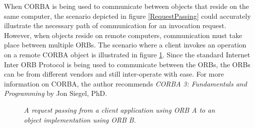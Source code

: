 When CORBA is being used to communicate between objects that reside 
on the same computer, the scenario depicted in figure \ref{RequestPassing}
could accurately illustrate the necessary path of communication for an 
invocation request.  However, when objects reside on remote computers, 
communication must take place between multiple ORBs.  The scenario where a 
client invokes an operation on a remote CORBA object is illustrated in 
figure \ref{ORB2ORB}.   
Since the standard Internet Inter ORB Protocol is being used to communicate 
between the ORBs, the ORBs can be from different vendors and still inter-operate
with ease.   
For more information on CORBA, the author recommends {\em{CORBA 3: Fundamentals
and Programming}} by Jon Siegel, PhD.  
\begin{figure}
\begin{center}
\leavevmode
\caption{\em{A request passing from a client application using ORB A to an object implementation using ORB B}.}
\figline
         \label{ORB2ORB}
\end{center}
\end{figure}
